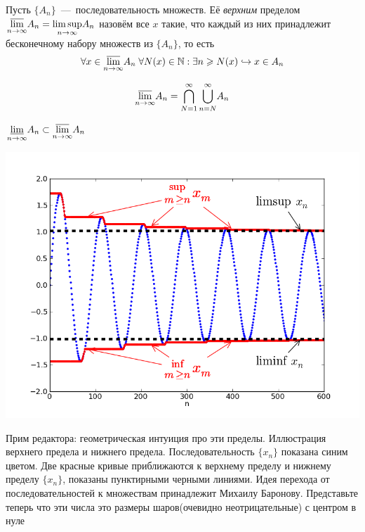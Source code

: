 \begin{definition}
    Пусть $\{A_n\}$~---~последовательность множеств. Её \textit{верхним} пределом $\underset{n \rightarrow \infty}{\overline{\lim}} A_n = \underset{n \rightarrow \infty}{\limsup} A_n$ назовём все $x$ такие, что каждый из них принадлежит бесконечному набору множеств из $\{A_n\}$, то есть 
     \[\forall x \in \underset{n \rightarrow \infty}{\overline{\lim}} A_n \; \forall N(x) \in \mathbb{N} : \exists n \geqslant N(x) \hookrightarrow x \in A_n\]
    
    \[\underset{n \rightarrow \infty}{\overline{\lim}} A_n = \overset{\infty}{\underset{N = 1}{\bigcap}} \, \overset{\infty}{\underset{n = N}{\bigcup}}A_n\]
\end{definition}

\begin{proposition}
    $\underset{n \rightarrow \infty}{\underline{\lim}} A_n \subset \underset{n \rightarrow \infty}{\overline{\lim}} A_n$\
\end{proposition}

\begin{minipage}{0.5\textwidth}%
    \includegraphics[width=1.0\textwidth]{images/Lim_sup_example_5.png} 
\end{minipage}%
\hfill%
\begin{minipage}{0.5\textwidth}\raggedright
Прим редактора: геометрическая интуиция про эти пределы. Иллюстрация верхнего предела и нижнего предела. Последовательность $\{x_n\}$ показана синим цветом. Две красные кривые приближаются к верхнему пределу и нижнему пределу $\{x_n\}$, показаны пунктирными черными линиями. 
Идея перехода от последовательностей к множествам принадлежит Михаилу Баронову. Представьте теперь что эти числа это размеры шаров(очевидно неотрицательные) с центром в нуле
\end{minipage}

